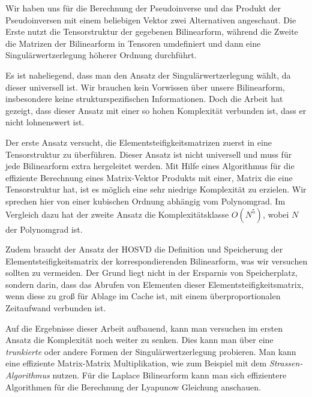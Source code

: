 Wir haben uns für die Berechnung der Pseudoinverse und das Produkt der Pseudoinversen mit einem beliebigen Vektor zwei Alternativen angeschaut. Die Erste nutzt die Tensorstruktur der gegebenen Bilinearform, während die Zweite die Matrizen der Bilinearform in Tensoren umdefiniert und dann eine Singulärwertzerlegung höherer Ordnung durchführt.

Es ist naheliegend, dass man den Ansatz der Singulärwertzerlegung wählt, da dieser universell ist. Wir brauchen kein Vorwissen über unsere Bilinearform, insbesondere keine strukturspezifischen Informationen.
Doch die Arbeit hat gezeigt, dass dieser Ansatz mit einer so hohen Komplexität verbunden ist, dass er nicht lohnenswert ist.

Der erste Ansatz versucht, die Elementsteifigkeitsmatrizen zuerst in eine Tensorstruktur zu überführen. Dieser Ansatz ist nicht universell und muss für jede Bilinearform extra hergeleitet werden. Mit Hilfe eines Algorithmus für die effiziente Berechnung eines Matrix-Vektor Produkts mit einer, Matrix die eine Tensorstruktur hat, ist es möglich eine sehr niedrige Komplexität zu erzielen. Wir sprechen hier von einer kubischen Ordnung abhängig vom Polynomgrad. Im Vergleich dazu hat der zweite Ansatz die Komplexitätsklasse $O(N^{5})$, wobei $N$ der Polynomgrad ist. 

Zudem braucht der Ansatz der HOSVD die Definition und Speicherung der Elementsteifigkeitsmatrix der korrespondierenden Bilinearform, was wir versuchen sollten zu vermeiden. Der Grund liegt nicht in der Ersparnis von Speicherplatz, sondern darin, dass das Abrufen von Elementen dieser Elementsteifigkeitsmatrix, wenn diese zu groß für Ablage im Cache ist, mit einem überproportionalen Zeitaufwand verbunden ist. 

Auf die Ergebnisse dieser Arbeit aufbauend, kann man versuchen im ersten Ansatz die Komplexität noch weiter zu senken. Dies kann man über eine \textit{trunkierte} oder andere Formen der Singulärwertzerlegung probieren. Man kann eine effiziente Matrix-Matrix Multiplikation, wie zum Beispiel mit dem \textit{Strassen-Algorithmus} nutzen. Für die Laplace Bilinearform kann man sich effizientere Algorithmen für die Berechnung der Lyapunow Gleichung anschauen.



